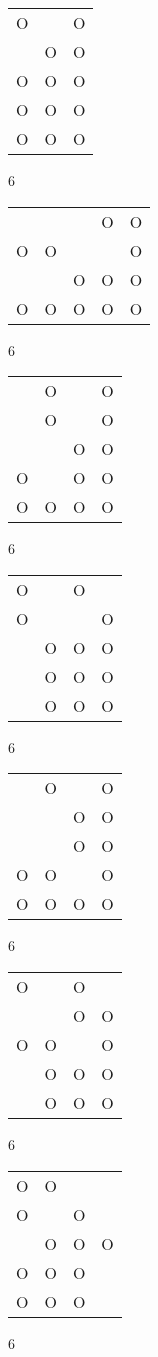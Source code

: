 \begin{tabular}{|m{0.2cm}m{0.2cm}m{0.2cm}|}\hline
O& &O\\
 &O&O\\
O&O&O\\
O&O&O\\
O&O&O\\
\hline\end{tabular}6
\begin{tabular}{|m{0.2cm}m{0.2cm}m{0.2cm}m{0.2cm}m{0.2cm}|}\hline
 & & &O&O\\
O&O& & &O\\
 & &O&O&O\\
O&O&O&O&O\\
\hline\end{tabular}6
\begin{tabular}{|m{0.2cm}m{0.2cm}m{0.2cm}m{0.2cm}|}\hline
 &O& &O\\
 &O& &O\\
 & &O&O\\
O& &O&O\\
O&O&O&O\\
\hline\end{tabular}6
\begin{tabular}{|m{0.2cm}m{0.2cm}m{0.2cm}m{0.2cm}|}\hline
O& &O& \\
O& & &O\\
 &O&O&O\\
 &O&O&O\\
 &O&O&O\\
\hline\end{tabular}6
\begin{tabular}{|m{0.2cm}m{0.2cm}m{0.2cm}m{0.2cm}|}\hline
 &O& &O\\
 & &O&O\\
 & &O&O\\
O&O& &O\\
O&O&O&O\\
\hline\end{tabular}6
\begin{tabular}{|m{0.2cm}m{0.2cm}m{0.2cm}m{0.2cm}|}\hline
O& &O& \\
 & &O&O\\
O&O& &O\\
 &O&O&O\\
 &O&O&O\\
\hline\end{tabular}6
\begin{tabular}{|m{0.2cm}m{0.2cm}m{0.2cm}m{0.2cm}|}\hline
O&O& & \\
O& &O& \\
 &O&O&O\\
O&O&O& \\
O&O&O& \\
\hline\end{tabular}6
